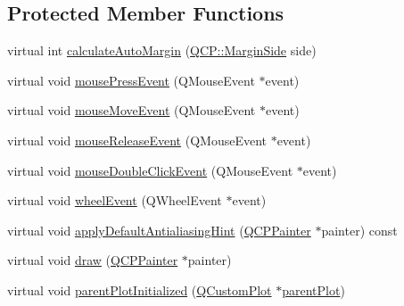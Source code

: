 \subsection*{Protected Member Functions}
\begin{DoxyCompactItemize}
\item 
virtual int \hyperlink{classQCPLayoutElement_a005c9f0fe84bc1591a2cf2c46fd477b4}{calculate\+Auto\+Margin} (\hyperlink{namespaceQCP_a7e487e3e2ccb62ab7771065bab7cae54}{Q\+C\+P\+::\+Margin\+Side} side)
\item 
virtual void \hyperlink{classQCPLayoutElement_a2d82ea21fe0ee628f177bd824bc51a71}{mouse\+Press\+Event} (Q\+Mouse\+Event $\ast$event)
\item 
virtual void \hyperlink{classQCPLayoutElement_a14f4acf58cdb8dd2c6c571479c4c4a40}{mouse\+Move\+Event} (Q\+Mouse\+Event $\ast$event)
\item 
virtual void \hyperlink{classQCPLayoutElement_ae526ac828cce1e5bb94eaa85776d7404}{mouse\+Release\+Event} (Q\+Mouse\+Event $\ast$event)
\item 
virtual void \hyperlink{classQCPLayoutElement_aa8fef6486cb6ceb7c82cbdd50bc32ee9}{mouse\+Double\+Click\+Event} (Q\+Mouse\+Event $\ast$event)
\item 
virtual void \hyperlink{classQCPLayoutElement_a300521d2fd18a893c1b85f6be11ce2bf}{wheel\+Event} (Q\+Wheel\+Event $\ast$event)
\item 
virtual void \hyperlink{classQCPLayoutElement_ad6d2b4bb0291c2441b2e1ca3d5296df5}{apply\+Default\+Antialiasing\+Hint} (\hyperlink{classQCPPainter}{Q\+C\+P\+Painter} $\ast$painter) const 
\item 
virtual void \hyperlink{classQCPLayoutElement_a547bcc1e6e2be5645ca781efe0834653}{draw} (\hyperlink{classQCPPainter}{Q\+C\+P\+Painter} $\ast$painter)
\item 
virtual void \hyperlink{classQCPLayoutElement_a1478899e80e8244b411e96ec3b2e5ce2}{parent\+Plot\+Initialized} (\hyperlink{classQCustomPlot}{Q\+Custom\+Plot} $\ast$\hyperlink{classQCPLayerable_ab7e0e94461566093d36ffc0f5312b109}{parent\+Plot})
\end{DoxyCompactItemize}
